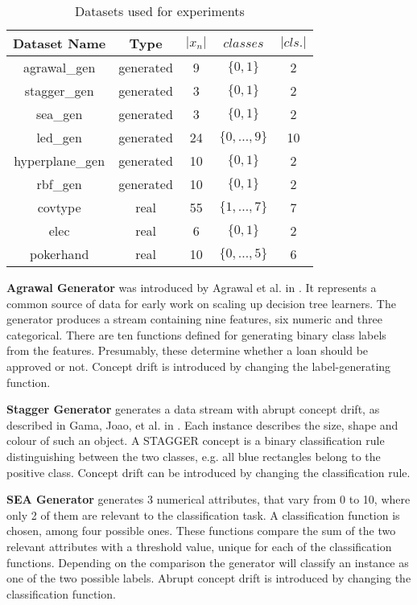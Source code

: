 \documentclass{sig-alternate-br}
\begin{document}
\begin{table}[h]
\centering
\renewcommand{\arraystretch}{1.25}
\begin{tabular}{|c|c|c|c|c|} \hline
\textbf{Dataset Name} & \textbf{Type} & \textbf{$|x_n|$} & \textbf{$classes$} & \textbf{$|cls.|$} \\ \hline
agrawal\_gen & generated & 9 & $\{0, 1\}$ & 2 \\ \hline
stagger\_gen & generated & 3 & $\{0, 1\}$ & 2 \\ \hline
sea\_gen & generated & 3 & $\{0, 1\}$ & 2 \\ \hline
led\_gen & generated & 24 & $\{0,\dots,9\}$ & 10 \\ \hline
hyperplane\_gen & generated & 10 & $\{0, 1\}$ & 2\\ \hline
rbf\_gen & generated & 10 & $\{0, 1\}$ & 2\\ \hline
covtype & real & 55 & $\{1,\dots,7\}$ & 7 \\ \hline
elec & real & 6 & $\{0, 1\}$ & 2 \\ \hline
pokerhand & real & 10 & $\{0,\dots,5\}$ & 6 \\ \hline
\end{tabular}
\caption{Datasets used for experiments}
\label{table:datasets}
\end{table}

\textbf{Agrawal Generator} was introduced by Agrawal et al. in \cite{agrawal1993database}. It represents a common source of data for early work on scaling up decision tree learners. The generator produces a stream containing nine features, six numeric and three categorical. There are ten functions defined for generating binary class labels from the features. Presumably, these determine whether a loan should be approved or not. Concept drift is introduced by changing the label-generating function.

\textbf{Stagger Generator} generates a data stream with abrupt concept drift, as described in Gama, Joao, et al. in \cite{gama2004learning}. Each instance describes the size, shape and colour of such an object. A STAGGER concept is a binary classification rule distinguishing between the two classes, e.g. all blue rectangles belong to the positive class\cite{van2016massively}. Concept drift can be introduced by changing the classification rule. 

\textbf{SEA Generator} generates 3 numerical attributes, that vary from 0 to 10, where only 2 of them are relevant to the classification task. A classification function is chosen, among four possible ones. These functions compare the sum of the two relevant attributes with a threshold value, unique for each of the classification functions\cite{street2001streaming}. Depending on the comparison the generator will classify an instance as one of the two possible labels. Abrupt concept drift is introduced by changing the classification function.
\end{document}
